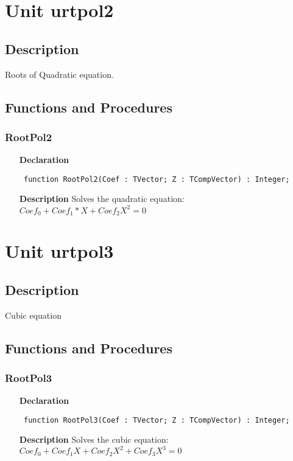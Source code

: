 \documentclass[12pt,a4paper,oneside]{report}
\newcommand{\declarationitem}[1]{\textbf{#1}}
\newcommand{\descriptiontitle}[1]{\textbf{#1}}
\newcommand{\code}[1]{\texttt{#1}}
\begin{document}
\section{Unit urtpol2}
\label{urtpol2}
\subsection{Description}Roots of Quadratic equation.
\subsection{Functions and Procedures}
\subsubsection{RootPol2}
\label{urtpol2-RootPol2}
\begin{itemize}\item[\declarationitem{Declaration}\hfill]
	\begin{flushleft}
		\code{
			function RootPol2(Coef : TVector; Z : TCompVector) : Integer;}
		
	\end{flushleft}
	
	\par
	\item[\descriptiontitle{Description}]
	Solves the quadratic equation:\\ 
	$Coef_0 + Coef_1 * X + Coef_2 X^2 = 0$
	
\end{itemize}
\section{Unit urtpol3}
\label{urtpol3}
\subsection{Description}
Cubic equation
\subsection{Functions and Procedures}
\subsubsection{RootPol3}
\label{urtpol3-RootPol3}
\begin{itemize}\item[\declarationitem{Declaration}\hfill]
	\begin{flushleft}
		\code{
			function RootPol3(Coef : TVector; Z : TCompVector) : Integer;}
		
	\end{flushleft}
	
	\par
	\item[\descriptiontitle{Description}]
	Solves the cubic equation:\\
	$Coef_0 + Coef_1 X + Coef_2 X^2 + Coef_3 X^3 = 0$
	
\end{itemize}
\end{document}
